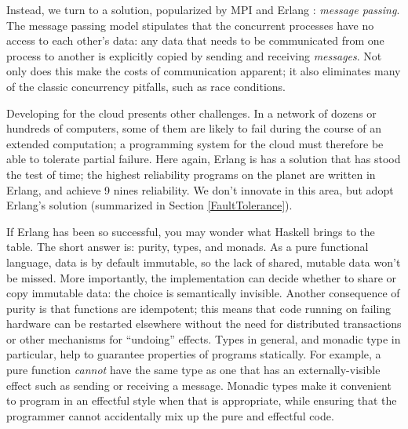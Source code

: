 \documentclass[preprint]{sigplanconf}
\begin{document}
Instead, we turn to a solution, popularized by MPI \cite{mpi99} and Erlang \cite{Erlang93}: {\em message passing}. The message passing model stipulates that the concurrent processes have no access to each other's data: any data that needs to be communicated from one process to another is explicitly copied by sending and receiving {\em messages}.  Not only does this make the costs of communication apparent; it also eliminates many of the classic concurrency pitfalls, such as race conditions.

Developing for the cloud presents other challenges.  In a network of dozens or hundreds of computers, some of them are likely to fail during the course of an extended computation; a programming system for the cloud must therefore be able to tolerate partial failure.  Here again, Erlang is has a solution that has stood the test of time; the highest reliability programs on the planet are written in Erlang, and achieve 9 nines reliability.  We don't innovate in this area, but adopt Erlang's solution (summarized in Section \ref{FaultTolerance}).

If Erlang has been so successful, you may wonder what Haskell brings to the table. 
The short answer is: purity, types, and monads.  As a pure functional language, data is by default immutable, so the lack of shared, mutable data won't be missed.  More importantly, the implementation can decide whether to share or copy immutable data: the choice is semantically invisible. Another consequence of purity is that functions are idempotent; this means that code running on failing hardware can be restarted elsewhere without the need for distributed transactions or other mechanisms for ``undoing'' effects.  
Types in general, and monadic type in particular, help to guarantee properties of programs statically.  
For example, a pure function \emph{cannot} have the same type as one that has an externally-visible effect such as sending or receiving a message.  
Monadic types make it convenient to program in an effectful style when that is appropriate, while ensuring that the programmer cannot accidentally mix up the pure and effectful code.
\end{document}
